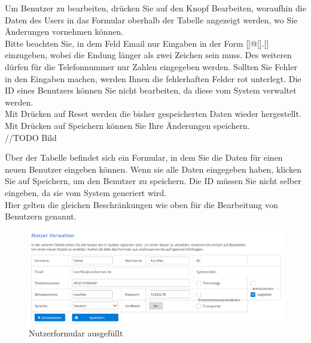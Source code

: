 \documentclass[enabledeprecatedfontcommands,fontsize=12pt,paper=a4,twoside]{scrartcl}
\begin{document}
Um Benutzer zu bearbeiten, drücken Sie auf den Knopf Bearbeiten, woraufhin die Daten des Users in das Formular oberhalb der Tabelle angezeigt werden, wo Sie Änderungen vornehmen können. \\
Bitte beachten Sie, in dem Feld Email nur Eingaben in der Form []@[].[] einzugeben, wobei die Endung länger als zwei Zeichen sein muss. Des weiteren dürfen für die Telefonnummer nur Zahlen eingegeben werden. Sollten Sie Fehler in den Eingaben machen, werden Ihnen die fehlerhaften Felder rot unterlegt. Die ID eines Benutzers können Sie nicht bearbeiten, da diese vom System verwaltet werden. \\
Mit Drücken auf Reset werden die bisher gespeicherten Daten wieder hergestellt. Mit Drücken auf Speichern können Sie Ihre Änderungen speichern. \\

//TODO Bild

Über der Tabelle befindet sich ein Formular, in dem Sie die Daten für einen neuen Benutzer eingeben können. Wenn sie alle Daten eingegeben haben, klicken Sie auf Speichern, um den Benutzer zu speichern. Die ID müssen Sie nicht selber eingeben, da sie vom System generiert wird. \\
Hier gelten die gleichen Beschränkungen wie oben für die Bearbeitung von Benutzern genannt. \\

\begin{figure}[h!]
\begin{center}
 \includegraphics[width=\textwidth]{screenshots/admin/nutzerformularausgefuellt.png}
  \caption{Nutzerformular ausgefüllt}
  \label{fig:boat3}
\end{center}
\end{figure}
\end{document}
